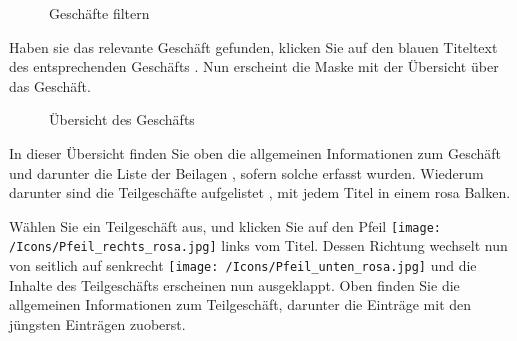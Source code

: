 \begin{figure}[H]
\caption{Geschäfte filtern}
\end{figure}

Haben sie das relevante Geschäft gefunden, klicken Sie auf den blauen Titeltext des entsprechenden Geschäfts . Nun erscheint die Maske mit der Übersicht über das Geschäft.

\begin{figure}[H]
\caption{Übersicht des Geschäfts}
\end{figure}

In dieser Übersicht finden Sie oben die allgemeinen Informationen zum Geschäft  und darunter die Liste der Beilagen , sofern solche erfasst wurden. Wiederum darunter sind die Teilgeschäfte aufgelistet , mit jedem Titel in einem rosa Balken.

\vspace{\baselineskip}

Wählen Sie ein Teilgeschäft aus, und klicken Sie auf den Pfeil \texttt{[image: /Icons/Pfeil\_rechts\_rosa.jpg]} links vom Titel. Dessen Richtung wechselt nun von seitlich auf senkrecht \texttt{[image: /Icons/Pfeil\_unten\_rosa.jpg]} und die Inhalte des Teilgeschäfts erscheinen nun ausgeklappt. Oben finden Sie die allgemeinen Informationen zum Teilgeschäft, darunter die Einträge mit den jüngsten Einträgen zuoberst.

